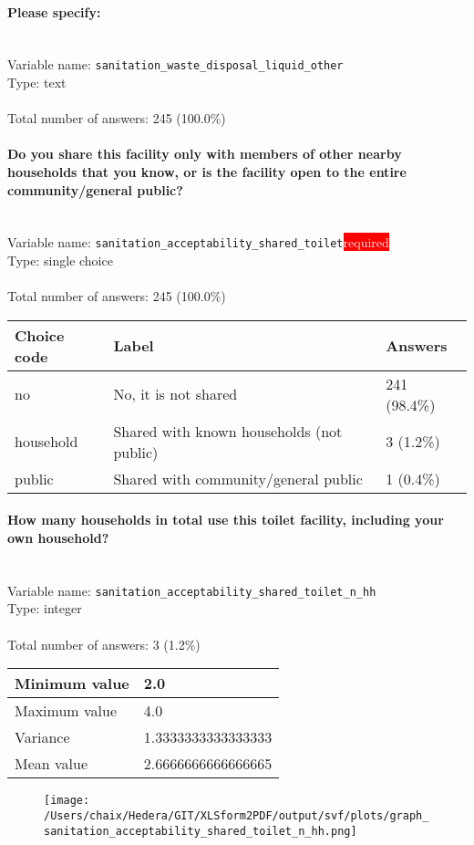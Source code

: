 \documentclass[11.5pt, a4paper]{scrartcl}
\begin{document}
\paragraph{Please specify:}
\  \\Variable name: \texttt{sanitation\_waste\_disposal\_liquid\_other}\\
Type: text\\
\\Total number of answers: 245 (100.0\%)
\\[0.2em]\paragraph{Do you share this facility only with members of other nearby households that you know, or is the facility open to the entire community/general public? }
\  \\Variable name: \texttt{sanitation\_acceptability\_shared\_toilet}\hfill\colorbox{red}{\small{\textcolor{white}{required}}}\\
 Type: single choice\\
\\Total number of answers: 245 (100.0\%)
\\[0.2em] \begin{tabular}{p{4cm}|p{8cm}|p{3cm}}
Choice code & Label & Answers \\
\hline
no & No, it is not shared& \cellcolor{color4}241 (98.4\%)\\
\cellcolor{mygray} household & \cellcolor{mygray}Shared with known households (not public)  & \cellcolor{color0}3 (1.2\%)\\
public & Shared with community/general public & \cellcolor{color0}1 (0.4\%)\\
\end{tabular}
\paragraph{How many households in total use this toilet facility, including your own household? }
\  \\Variable name: \texttt{sanitation\_acceptability\_shared\_toilet\_n\_hh}\\
Type: integer\\
\\Total number of answers: 3 (1.2\%)
\\[0.2em] \begin{tabular}{p{4cm}|p{8cm}}
Minimum value &2.0 \\
\hline
\cellcolor{mygray} Maximum value & \cellcolor{mygray}4.0 \\
\hline
Variance &1.3333333333333333 \\
\hline
\cellcolor{mygray} Mean value & \cellcolor{mygray}2.6666666666666665 \\
\hline
\end{tabular}
\begin{figure}[H]
\centering
\texttt{[image: /Users/chaix/Hedera/GIT/XLSform2PDF/output/svf/plots/graph\_sanitation\_acceptability\_shared\_toilet\_n\_hh.png]}
\end{figure}
\end{document}
